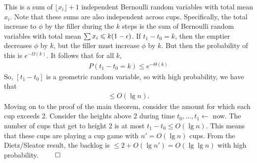 \documentclass{report}
\begin{document}
This is a sum of $\lfloor x_i\rfloor + 1$ independent Bernoulli random variables with total mean $x_i$. Note that these sums are also independent across cups. Specifically, the total increase to $\phi$ by the filler during the $k$ steps is the sum of Bernoulli random variables with total mean $\sum x_i \leqslant k(1-\epsilon)$. 
\newpage
{}
\noindent If $t_1 - t_0 = k$, then the emptier decreases $\phi$ by $k$, but the filler must increase $\phi$ by $k$. But then the probability of this is $e^{-\Omega(k)}$. It follows that for all $k$, 
\begin{align*}
    P(t_1 - t_0 = k) \leq e^{-\Theta(k)}
\end{align*}
So, $[t_1 - t_0]$ is a geometric random variable, so with high probability, we have that 
\begin{align*}
    [t_1 - t_0] \leq O(\lg n).
\end{align*}
Moving on to the proof of the main theorem, consider the amount for which each cup exceeds 2. Consider the heights above 2 during time $t_0, \ldots, t_1 \leftarrow$ now. The number of cups that get to height 2 is at most $t_1 - t_0 \leq O(\lg n)$. This means that these cups are playing a cup game with $n' = O(\lg n)$ cups. From the Dietz/Sleator result, the backlog is $\leq 2 + O(\lg n') = O(\lg \lg n)$ with high probability. $\hfill \qed$
\end{document}
